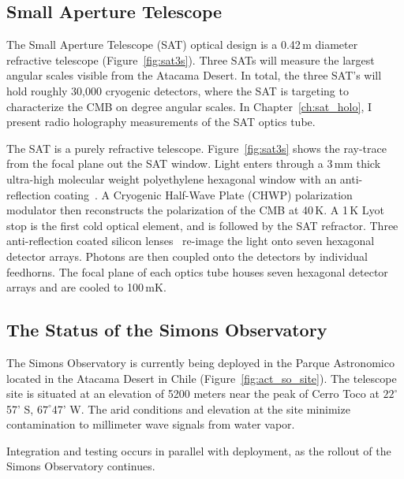 \subsection{Small Aperture Telescope}

The Small Aperture Telescope (SAT) optical design is a 0.42\,m diameter refractive telescope (Figure~\ref{fig:sat3s}).  Three SATs will measure the largest angular scales visible from the Atacama Desert.  In total, the three SAT's will hold roughly 30,000 cryogenic detectors, where the SAT is targeting to characterize the CMB on degree angular scales.  In Chapter~\ref{ch:sat_holo}, I present radio holography measurements of the SAT optics tube.

The SAT is a purely refractive telescope.  Figure~\ref{fig:sat3s} shows the ray-trace from the focal plane out the SAT window.  Light enters through a 3\,mm thick ultra-high molecular weight polyethylene hexagonal window with an anti-reflection coating~\cite{zhu18}.  A Cryogenic Half-Wave Plate (CHWP) polarization modulator then reconstructs the polarization of the CMB at 40\,K.  A 1\,K Lyot stop is the first cold optical element, and is followed by the SAT refractor.  Three anti-reflection coated silicon lenses~\cite{Datta:13,golec20} re-image the light onto seven hexagonal detector arrays.   Photons are then coupled onto the detectors by individual feedhorns.  The focal plane of each optics tube houses seven hexagonal detector arrays and are cooled to 100\,mK.

\subsection{The Status of the Simons Observatory}

The Simons Observatory is currently being deployed in the Parque Astronomico located in the Atacama Desert in Chile (Figure~\ref{fig:act_so_site}). The telescope site is situated at an elevation of 5200 meters near the peak of Cerro Toco at $22 ^\circ$ 57' S, $67^\circ$47' W.  The arid conditions and elevation at the site minimize contamination to millimeter wave signals from water vapor.

Integration and testing occurs in parallel with deployment, as the rollout of the Simons Observatory continues.